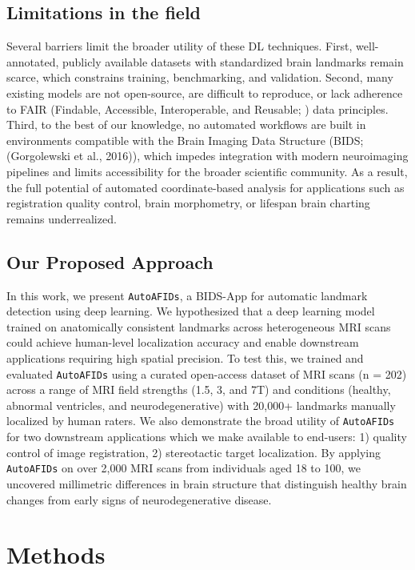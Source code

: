 \subsection{Limitations in the field}
Several barriers limit the broader utility of these DL techniques. First, well-annotated, publicly available datasets with standardized brain landmarks remain scarce, which constrains training, benchmarking, and validation. Second, many existing models are not open-source, are difficult to reproduce, or lack adherence to FAIR (Findable, Accessible, Interoperable, and Reusable; \cite{Wilkinson2016-it}) data principles. Third, to the best of our knowledge, no automated workflows are built in environments compatible with the Brain Imaging Data Structure (BIDS; (Gorgolewski et al., 2016)), which impedes integration with modern neuroimaging pipelines and limits accessibility for the broader scientific community. As a result, the full potential of automated coordinate-based analysis for applications such as registration quality control, brain morphometry, or lifespan brain charting remains underrealized.

\subsection{Our Proposed Approach}
In this work, we present \texttt{AutoAFIDs}, a BIDS-App for automatic landmark detection using deep learning. We hypothesized that a deep learning model trained on anatomically consistent landmarks across heterogeneous MRI scans could achieve human-level localization accuracy and enable downstream applications requiring high spatial precision. To test this, we trained and evaluated \texttt{AutoAFIDs} using a curated open-access dataset of MRI scans (n = 202) across a range of MRI field strengths (1.5, 3, and 7T) and conditions (healthy, abnormal ventricles, and neurodegenerative) with 20,000+ landmarks manually localized by human raters. We also demonstrate the broad utility of \texttt{AutoAFIDs} for two downstream applications which we make available to end-users: 1) quality control of image registration, 2) stereotactic target localization. By applying \texttt{AutoAFIDs} on over 2,000 MRI scans from individuals aged 18 to 100, we uncovered millimetric differences in brain structure that distinguish healthy brain changes from early signs of neurodegenerative disease.

\section{Methods}
